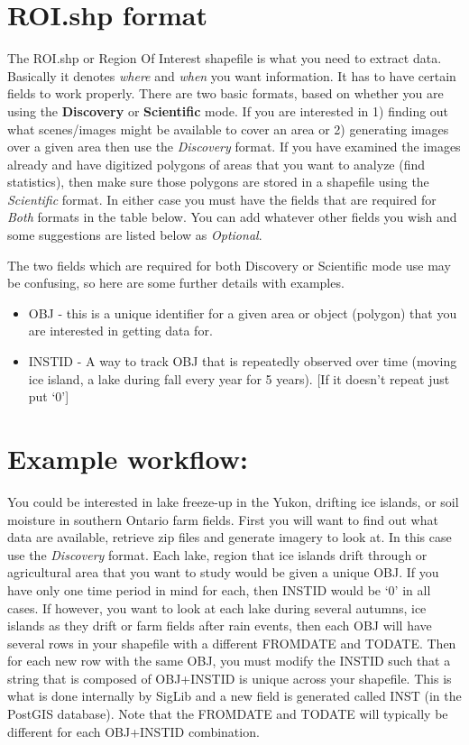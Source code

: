 \documentclass[letterpaper,10pt,openany,oneside]{sphinxmanual}
\begin{document}
\section{ROI.shp format}
\label{project:roi-shp-format}
The ROI.shp or Region Of Interest shapefile is what you need to extract
data. Basically it denotes \emph{where} and \emph{when} you want information. It
has to have certain fields to work properly. There are two basic
formats, based on whether you are using the \textbf{Discovery} or
\textbf{Scientific} mode. If you are interested in 1) finding out what
scenes/images might be available to cover an area or 2) generating
images over a given area then use the \emph{Discovery} format. If you have
examined the images already and have digitized polygons of areas that
you want to analyze (find statistics), then make sure those polygons are
stored in a shapefile using the \emph{Scientific} format. In either case you
must have the fields that are required for \emph{Both} formats in the table
below. You can add whatever other fields you wish and some suggestions
are listed below as \emph{Optional}.

The two fields which are required for both Discovery or Scientific mode
use may be confusing, so here are some further details with examples.
\begin{itemize}
\item {} 
OBJ - this is a unique identifier for a given area or object
(polygon) that you are interested in getting data for.

\item {} 
INSTID - A way to track OBJ that is repeatedly observed over time
(moving ice island, a lake during fall every year for 5 years). {[}If
it doesn't repeat just put `0'{]}

\end{itemize}


\section{Example workflow:}
\label{project:example-workflow}
You could be interested in lake freeze-up in the Yukon, drifting ice
islands, or soil moisture in southern Ontario farm fields. First you
will want to find out what data are available, retrieve zip files and
generate imagery to look at. In this case use the \emph{Discovery} format.
Each lake, region that ice islands drift through or agricultural area
that you want to study would be given a unique OBJ. If you have only one
time period in mind for each, then INSTID would be `0' in all cases. If
however, you want to look at each lake during several autumns, ice
islands as they drift or farm fields after rain events, then each OBJ
will have several rows in your shapefile with a different FROMDATE and
TODATE. Then for each new row with the same OBJ, you must modify the
INSTID such that a string that is composed of OBJ+INSTID is unique
across your shapefile. This is what is done internally by SigLib and a
new field is generated called INST (in the PostGIS database). Note that
the FROMDATE and TODATE will typically be different for each OBJ+INSTID
combination.
\end{document}
